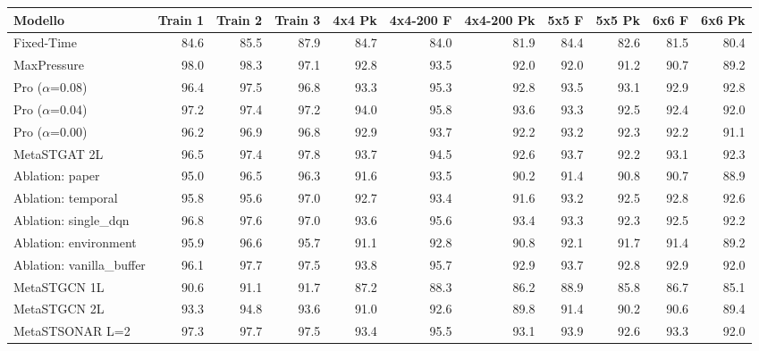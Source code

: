 \begin{table}
  \centering
  \tiny
  \begin{tabular}{@{}lrrrrrrrrrr@{}}
    \toprule
    Modello                   & Train 1 & Train 2 & Train 3 & 4x4 Pk & 4x4-200 F & 4x4-200 Pk & 5x5 F & 5x5 Pk & 6x6 F & 6x6 Pk \\
    \midrule
    Fixed-Time                & 84.6    & 85.5    & 87.9    & 84.7   & 84.0      & 81.9       & 84.4  & 82.6   & 81.5  & 80.4   \\
    MaxPressure               & 98.0    & 98.3    & 97.1    & 92.8   & 93.5      & 92.0       & 92.0  & 91.2   & 90.7  & 89.2   \\
    Pro ($\alpha$=0.08)       & 96.4    & 97.5    & 96.8    & 93.3   & 95.3      & 92.8       & 93.5  & 93.1   & 92.9  & 92.8   \\
    Pro ($\alpha$=0.04)       & 97.2    & 97.4    & 97.2    & 94.0   & 95.8      & 93.6       & 93.3  & 92.5   & 92.4  & 92.0   \\
    Pro ($\alpha$=0.00)       & 96.2    & 96.9    & 96.8    & 92.9   & 93.7      & 92.2       & 93.2  & 92.3   & 92.2  & 91.1   \\
    MetaSTGAT 2L              & 96.5    & 97.4    & 97.8    & 93.7   & 94.5      & 92.6       & 93.7  & 92.2   & 93.1  & 92.3   \\
    Ablation: paper           & 95.0    & 96.5    & 96.3    & 91.6   & 93.5      & 90.2       & 91.4  & 90.8   & 90.7  & 88.9   \\
    Ablation: temporal        & 95.8    & 95.6    & 97.0    & 92.7   & 93.4      & 91.6       & 93.2  & 92.5   & 92.8  & 92.6   \\
    Ablation: single\_dqn     & 96.8    & 97.6    & 97.0    & 93.6   & 95.6      & 93.4       & 93.3  & 92.3   & 92.5  & 92.2   \\
    Ablation: environment     & 95.9    & 96.6    & 95.7    & 91.1   & 92.8      & 90.8       & 92.1  & 91.7   & 91.4  & 89.2   \\
    Ablation: vanilla\_buffer & 96.1    & 97.7    & 97.5    & 93.8   & 95.7      & 92.9       & 93.7  & 92.8   & 92.9  & 92.0   \\
    MetaSTGCN 1L              & 90.6    & 91.1    & 91.7    & 87.2   & 88.3      & 86.2       & 88.9  & 85.8   & 86.7  & 85.1   \\
    MetaSTGCN 2L              & 93.3    & 94.8    & 93.6    & 91.0   & 92.6      & 89.8       & 91.4  & 90.2   & 90.6  & 89.4   \\
    MetaSTSONAR L=2           & 97.3    & 97.7    & 97.5    & 93.4   & 95.5      & 93.1       & 93.9  & 92.6   & 93.3  & 92.0   \\

\end{tabular}
\end{table}
